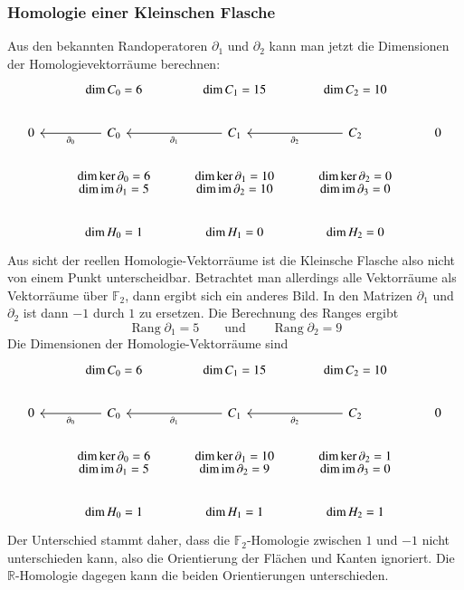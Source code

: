 \subsubsection{Homologie einer Kleinschen Flasche}
Aus den bekannten Randoperatoren $\partial_1$ und $\partial_2$ kann
man jetzt die Dimensionen der Homologievektorräume berechnen:
\[
\begin{tikzcd}
	&\operatorname{dim}C_0 = 6
		&\operatorname{dim}C_1 = 15
			&\operatorname{dim}C_2 = 10
				&
\\
0
	&C_0 \ar[l,"\partial_0"]
		&C_1 \ar[l,"\partial_1"]
			&C_2 \ar[l,"\partial_2"]
				&0
\\
	&{\textstyle\dim\operatorname{ker}\partial_0=6\atop
	  \textstyle\dim\operatorname{im}\partial_1=5}
		&{\textstyle\dim\operatorname{ker}\partial_1=10\atop
		  \textstyle\dim\operatorname{im}\partial_2=10}
			&{\textstyle\dim\operatorname{ker}\partial_2=0\atop
			  \textstyle\dim\operatorname{im}\partial_3=0}
\\
	&\dim H_0 = 1
		&\dim H_1 = 0
			&\dim H_2 = 0
\end{tikzcd}
\]
Aus sicht der reellen Homologie-Vektorräume ist die Kleinsche Flasche
also nicht von einem Punkt unterscheidbar.
Betrachtet man allerdings alle Vektorräume als Vektorräume über
$\mathbb F_2$, dann ergibt sich ein anderes Bild.
In den Matrizen $\partial_1$ und $\partial_2$ ist dann $-1$ durch $1$
zu ersetzen.
Die Berechnung des Ranges ergibt
\[
\operatorname{Rang}\partial_1 = 5
\qquad\text{und}\qquad
\operatorname{Rang}\partial_2 = 9
\]
Die Dimensionen der Homologie-Vektorräume sind
\[
\begin{tikzcd}
	&\operatorname{dim}C_0 = 6
		&\operatorname{dim}C_1 = 15
			&\operatorname{dim}C_2 = 10
				&
\\
0
	&C_0 \ar[l,"\partial_0"]
		&C_1 \ar[l,"\partial_1"]
			&C_2 \ar[l,"\partial_2"]
				&0
\\
	&{\textstyle\dim\operatorname{ker}\partial_0=6\atop
	  \textstyle\dim\operatorname{im}\partial_1=5}
		&{\textstyle\dim\operatorname{ker}\partial_1=10\atop
		  \textstyle\dim\operatorname{im}\partial_2=9}
			&{\textstyle\dim\operatorname{ker}\partial_2=1\atop
			  \textstyle\dim\operatorname{im}\partial_3=0}
\\
	&\dim H_0 = 1
		&\dim H_1 = 1
			&\dim H_2 = 1
\end{tikzcd}
\]
Der Unterschied stammt daher, dass die $\mathbb F_2$-Homologie zwischen
$1$ und $-1$ nicht unterschieden kann, also die Orientierung der
Flächen und Kanten ignoriert.
Die $\mathbb R$-Homologie dagegen kann die beiden Orientierungen
unterschieden.






